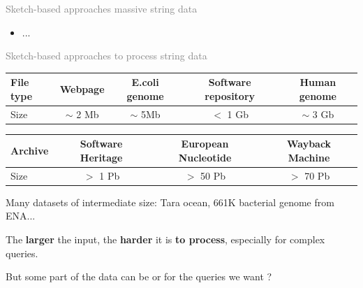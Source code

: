 \begin{frame}{\textcolor{gray}{Sketch-based approaches  massive string data}}
{\begin{minipage}[t][6cm][t]{0.3\textwidth}
\begin{itemize}
        \item ...
    \end{itemize}
    \vspace{0.3cm}
\end{minipage}}\pause
\hfill
{}\pause
\end{frame}

\begin{frame}{\textcolor{gray}{Sketch-based approaches to process  string data}}
    \pause
    \begin{center}
        \begin{tabular}{l c c c c}
            File type & Webpage &  E.coli genome & Software repository & Human genome\\ \hline
            Size & $\sim$ 2 Mb & $\sim$ 5Mb &  $<$ 1 Gb & $\sim$ 3 Gb 
        \end{tabular}\pause

        \bigskip

        \begin{tabular}{l c c c}
            Archive & Software Heritage & European Nucleotide & Wayback Machine  \\ \hline
            Size & $>$ 1 Pb & $>$ 50 Pb &  $>$ 70 Pb
        \end{tabular}
    \end{center}\pause

    \bigskip
    Many datasets of intermediate size: Tara ocean, 661K bacterial genome from ENA...\pause

    \bigskip

    The \textbf{larger} the input, the \textbf{harder} it is \textbf{to process}, especially for complex queries.\pause

    \bigskip

    But some part of the data can be  or  for the queries we want ?\pause

\end{frame}

